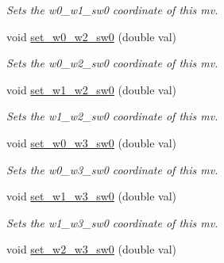 \begin{DoxyCompactItemize}
\begin{DoxyCompactList}\small\item\em Sets the w0\-\_\-w1\-\_\-sw0 coordinate of this mv. \end{DoxyCompactList}\item 
\hypertarget{classe3ga_1_1mv_a7a31977335e62d7e5e344a06754113a7}{void \hyperlink{classe3ga_1_1mv_a7a31977335e62d7e5e344a06754113a7}{set\-\_\-w0\-\_\-w2\-\_\-sw0} (double val)}\label{classe3ga_1_1mv_a7a31977335e62d7e5e344a06754113a7}

\begin{DoxyCompactList}\small\item\em Sets the w0\-\_\-w2\-\_\-sw0 coordinate of this mv. \end{DoxyCompactList}\item 
\hypertarget{classe3ga_1_1mv_af7d3a6392e9584821c124285a665f9f2}{void \hyperlink{classe3ga_1_1mv_af7d3a6392e9584821c124285a665f9f2}{set\-\_\-w1\-\_\-w2\-\_\-sw0} (double val)}\label{classe3ga_1_1mv_af7d3a6392e9584821c124285a665f9f2}

\begin{DoxyCompactList}\small\item\em Sets the w1\-\_\-w2\-\_\-sw0 coordinate of this mv. \end{DoxyCompactList}\item 
\hypertarget{classe3ga_1_1mv_acea78aeeedaa881a862e2e62db89a984}{void \hyperlink{classe3ga_1_1mv_acea78aeeedaa881a862e2e62db89a984}{set\-\_\-w0\-\_\-w3\-\_\-sw0} (double val)}\label{classe3ga_1_1mv_acea78aeeedaa881a862e2e62db89a984}

\begin{DoxyCompactList}\small\item\em Sets the w0\-\_\-w3\-\_\-sw0 coordinate of this mv. \end{DoxyCompactList}\item 
\hypertarget{classe3ga_1_1mv_af7b20a90f1a0d6e3ee52d199055fbbbf}{void \hyperlink{classe3ga_1_1mv_af7b20a90f1a0d6e3ee52d199055fbbbf}{set\-\_\-w1\-\_\-w3\-\_\-sw0} (double val)}\label{classe3ga_1_1mv_af7b20a90f1a0d6e3ee52d199055fbbbf}

\begin{DoxyCompactList}\small\item\em Sets the w1\-\_\-w3\-\_\-sw0 coordinate of this mv. \end{DoxyCompactList}\item 
\hypertarget{classe3ga_1_1mv_a43dc84b0d792278f2ecf0dfa81e55a80}{void \hyperlink{classe3ga_1_1mv_a43dc84b0d792278f2ecf0dfa81e55a80}{set\-\_\-w2\-\_\-w3\-\_\-sw0} (double val)}\label{classe3ga_1_1mv_a43dc84b0d792278f2ecf0dfa81e55a80}


\end{DoxyCompactItemize}
